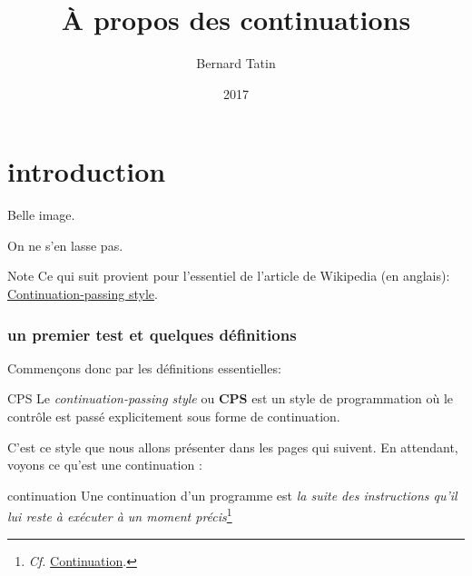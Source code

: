 \documentclass[A4,12pt]{scrartcl}%
\author{Bernard Tatin}
\date{2017}
\title{À propos des continuations}
\begin{document}
\maketitle
{}

\tableofcontents

\part{introduction}

Belle image.


On ne s'en lasse pas.

\begin{note}{Note}
Ce qui suit provient pour l'essentiel de l'article de Wikipedia (en anglais): \href{https://en.wikipedia.org/wiki/Continuation-passing_style}{Continuation-passing style}.
\end{note}

\section{un premier test et quelques définitions}
Commençons donc par les définitions essentielles:

\begin{termdefinition}{CPS}
Le \emph{continuation-passing style} ou \textbf{CPS} est un style de programmation où le contrôle est passé explicitement sous forme de continuation.
\end{termdefinition}

C'est ce style que nous allons présenter dans les pages qui suivent. En attendant, voyons ce qu'est une continuation :

\begin{termdefinition}{continuation}
Une continuation d'un programme est \emph{la suite des instructions qu'il lui reste à exécuter à un moment précis}\footnote{\emph{Cf.}
\href{https://fr.wikipedia.org/wiki/Continuation}{Continuation}.}
\end{termdefinition}
\end{document}
